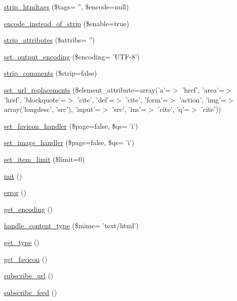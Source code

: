 \begin{DoxyCompactItemize}
\hyperlink{class_simple_pie_afe46d62476062698e931ab4c792732ba}{strip\-\_\-htmltags} (\$tags= '', \$encode=null)
\item 
\hyperlink{class_simple_pie_a870a0498a2f7fd907f4be9b8db704476}{encode\-\_\-instead\-\_\-of\-\_\-strip} (\$enable=true)
\item 
\hyperlink{class_simple_pie_ad1b3618c0d3c7bef6e215738456f58c2}{strip\-\_\-attributes} (\$attribs= '')
\item 
\hyperlink{class_simple_pie_a58bc15914e6bfceaa257aabff1e91aa9}{set\-\_\-output\-\_\-encoding} (\$encoding= 'U\-T\-F-\/8')
\item 
\hyperlink{class_simple_pie_a4da1bfa64972099fa3237d8c763e4fc8}{strip\-\_\-comments} (\$strip=false)
\item 
\hyperlink{class_simple_pie_a501ff19b988317c7053b093780259040}{set\-\_\-url\-\_\-replacements} (\$element\-\_\-attribute=array('a'=$>$ 'href', 'area'=$>$ 'href', 'blockquote'=$>$ 'cite', 'del'=$>$ 'cite', 'form'=$>$ 'action', 'img'=$>$ array('longdesc', 'src'), 'input'=$>$ 'src', 'ins'=$>$ 'cite', 'q'=$>$ 'cite'))
\item 
\hyperlink{class_simple_pie_a198c042ebc9101c3f23479288e879b77}{set\-\_\-favicon\-\_\-handler} (\$page=false, \$qs= 'i')
\item 
\hyperlink{class_simple_pie_a7a1fbadced1cbbb832318680ad6c1ccd}{set\-\_\-image\-\_\-handler} (\$page=false, \$qs= 'i')
\item 
\hyperlink{class_simple_pie_a0d02bb0b04656f2fe6d272e5a6a43b48}{set\-\_\-item\-\_\-limit} (\$limit=0)
\item 
\hyperlink{class_simple_pie_a64b3c0dfd5f6c319fb62c39c456e2b35}{init} ()
\item 
\hyperlink{class_simple_pie_a7d4dc3aac3394ff4b1d7684ac3f60dfd}{error} ()
\item 
\hyperlink{class_simple_pie_abb8fb22494152b59213051b7df22fc81}{get\-\_\-encoding} ()
\item 
\hyperlink{class_simple_pie_a846e710bcf813b6e5289b5816855f6e1}{handle\-\_\-content\-\_\-type} (\$mime= 'text/html')
\item 
\hyperlink{class_simple_pie_a807fc0843a5b3ac84b30c80226be87fe}{get\-\_\-type} ()
\item 
\hyperlink{class_simple_pie_ad9ae2195c6464085b4ffe58d83b4bac7}{get\-\_\-favicon} ()
\item 
\hyperlink{class_simple_pie_a128eeaeb14bdc6e246ba2e0bf655be9a}{subscribe\-\_\-url} ()
\item 
\hyperlink{class_simple_pie_aba71744aa95a4e464074b025e11f61b5}{subscribe\-\_\-feed} ()

\end{DoxyCompactItemize}

